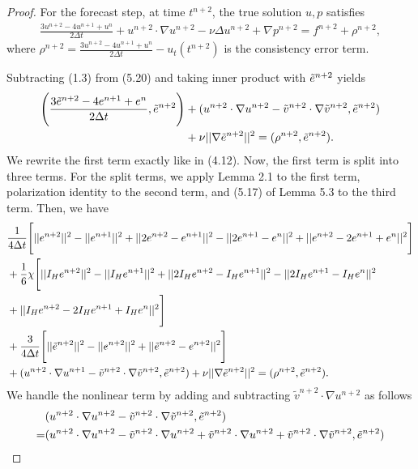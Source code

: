 \documentclass[11pt,a4paper]{article}
\begin{document}
\begin{proof}
    For the forecast step, at time $t^{n+2}$, the true solution $u,p$ satisfies
    \begin{align}
        \frac{3u^{n+2}-4u^{n+1}+u^n}{2\Delta t}+u^{n+2} \cdot \nabla u^{n+2} - \nu \Delta u^{n+2} + \nabla p^{n+2}=f^{n+2}+\rho^{n+2},
    \end{align}
    where $\rho^{n+2}=\frac{3u^{n+2}-4u^{n+1}+u^n}{2\Delta t}-u_t(t^{n+2})$ is the consistency error term.
    
    Subtracting (1.3) from (5.20) and taking inner product with $\Tilde{e}^{n+2}$ yields
    \begin{align}
        \Bigg(\frac{3\Tilde{e}^{n+2}-4e^{n+1}+e^n}{2\Delta t}, \Tilde{e}^{n+2}\Bigg)
        &+(u^{n+2} \cdot \nabla u^{n+2}- \tilde{v}^{n+2} \cdot \nabla \Tilde{v}^{n+2}, \Tilde{e}^{n+2}) \notag \\
        &+ \nu ||\nabla \Tilde{e}^{n+2}||^2=(\rho^{n+2}, \Tilde{e}^{n+2}).
    \end{align}
    We rewrite the first term exactly like in (4.12). Now, the first term is split into three terms. For the split terms, we apply Lemma 2.1 to the first term, polarization identity to the second term, and (5.17) of Lemma 5.3 to the third term. Then, we have
    \begin{align}
        &\frac{1}{4\Delta t}\Bigg[||e^{n+2}||^2-||e^{n+1}||^2+||2e^{n+2}-e^{n+1}||^2-||2e^{n+1}-e^n||^2+||e^{n+2}-2e^{n+1}+e^n||^2\Bigg] \notag   \\
        &+\frac{1}{6}\chi \Bigg[ ||I_He^{n+2}||^2 - ||I_He^{n+1}||^2 + ||2I_He^{n+2}-I_He^{n+1}||^2 - ||2I_He^{n+1}-I_He^n||^2  \notag \\
        &+||I_He^{n+2}-2I_He^{n+1}+I_He^n||^2\Bigg] \\
        &+\frac{3}{4\Delta t}\Bigg[||\Tilde{e}^{n+2}||^2-||e^{n+2}||^2 + ||\Tilde{e}^{n+2}-e^{n+2}||^2 \Bigg] \notag \\
        &+(u^{n+2} \cdot \nabla u^{n+1}- \tilde{v}^{n+2} \cdot \nabla \Tilde{v}^{n+2}, \Tilde{e}^{n+2}) +\nu ||\nabla \Tilde{e}^{n+2}||^2 = (\rho^{n+2},\Tilde{e}^{n+2}). \notag
    \end{align}
    We handle the nonlinear term by adding and subtracting $\tilde{v}^{n+2}\cdot \nabla u^{n+2}$ as follows
    \begin{align}
        &(u^{n+2} \cdot \nabla u^{n+2}-\tilde{v}^{n+2} \cdot \nabla \Tilde{v}^{n+2}, \Tilde{e}^{n+2}) \notag \\
        =&(u^{n+2} \cdot \nabla u^{n+2} -\tilde{v}^{n+2} \cdot \nabla u^{n+2} + \tilde{v}^{n+2}\cdot \nabla u^{n+2} + \tilde{v}^{n+2}\cdot \nabla \tilde{v}^{n+2}, \Tilde{e}^{n+2}) \notag \\

\end{align}
\end{proof}
\end{document}
